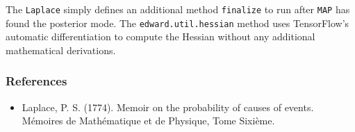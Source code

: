 The \texttt{Laplace} simply defines an additional method \texttt{finalize} to
run after \texttt{MAP} has found the posterior mode. The
\texttt{edward.util.hessian} method uses TensorFlow's automatic differentiation
to compute the Hessian without any additional mathematical derivations.

\subsubsection{References}\label{references}

\begin{itemize}
\item
  Laplace, P. S. (1774). Memoir on the probability of causes of
  events. Mémoires de Mathématique et de Physique, Tome Sixième.
\end{itemize}
